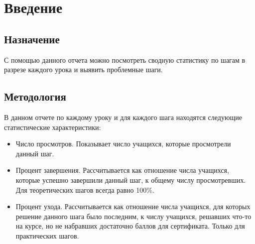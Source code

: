 \chapter{Введение}
\section*{Назначение}
С помощью данного отчета можно посмотреть сводную статистику по шагам в разрезе каждого урока \addcoursetexttointro{} и выявить проблемные шаги.
\section*{Методология}
В данном отчете по каждому уроку и для каждого шага находятся следующие статистические характеристики:
\begin{itemize}
\item Число просмотров. Показывает число учащихся, которые просмотрели данный шаг.
\item Процент завершения. Рассчитывается как отношение числа учащихся, которые успешно завершили данный шаг, к общему числу просмотревших. Для теоретических шагов всегда равно 100\%.
\item Процент ухода. Рассчитывается как отношение числа учащихся, для которых решение данного шага было последним, к числу учащихся, решавших что-то на курсе, но не набравших достаточно баллов для сертификата. Только для практических шагов.
\end{itemize}


